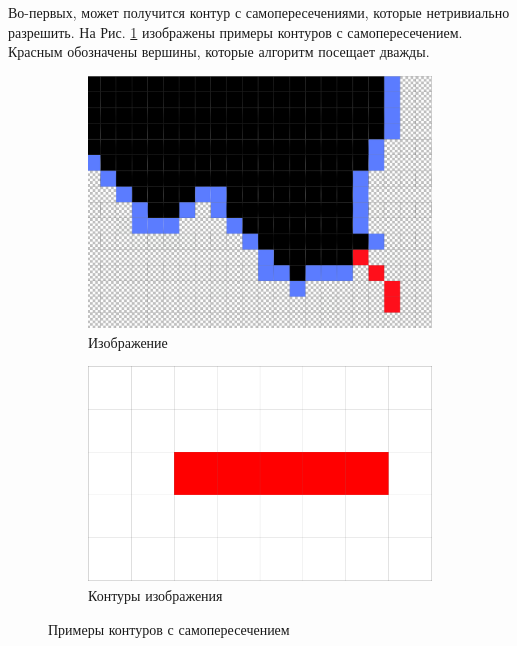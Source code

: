 \documentclass{fefu_thesis/cls/fefu}
\begin{document}
    Во-первых, может получится контур с самопересечениями, которые нетривиально разрешить. На Рис. \ref{SelfIntersectingContours} изображены примеры контуров с самопересечением. Красным обозначены вершины, которые алгоритм посещает дважды.
    \begin{figure}[H]
        \centering
        \begin{subfigure}[t]{.49\linewidth}
            \centering
            \includegraphics[scale=0.2]{images/SelfIntersectingContour1.png}
            \caption{Изображение}
        \end{subfigure}
        \begin{subfigure}[t]{.49\linewidth}
            \centering
            \includegraphics[scale=0.4]{images/SelfIntersectingContour2.png}
            \caption{Контуры изображения}
        \end{subfigure}
        \caption{Примеры контуров с самопересечением}
        \label{SelfIntersectingContours}
    \end{figure}
\end{document}
